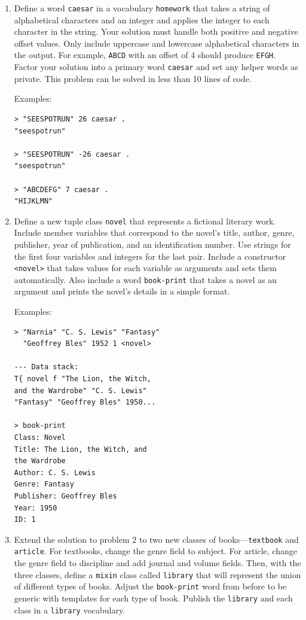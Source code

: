 \documentclass[sigconf]{acmart}
\begin{document}
\begin{enumerate}

\item
Define a word \texttt{caesar} in a vocabulary \texttt{homework}
that takes a string of alphabetical characters and an integer 
and applies the integer to each character in the string. Your
solution must handle both positive and negative offset values.
Only include uppercase and lowercase alphabetical characters 
in the output. For example, \texttt{ABCD} with an offset of 4 
should produce \texttt{EFGH}. Factor your solution into a
primary word \texttt{caesar} and set any helper words as 
private. This problem can be solved in less than 10 lines of 
code. 

\noindent
Examples:

\begin{lstlisting}
> "SEESPOTRUN" 26 caesar .
"seespotrun"

> "SEESPOTRUN" -26 caesar .
"seespotrun"

> "ABCDEFG" 7 caesar .
"HIJKLMN"
\end{lstlisting}

\item
Define a new tuple class \texttt{novel} that represents a 
fictional literary work. Include member variables that 
correspond to the novel's title, author, genre, publisher,
year of publication, and an identification number. Use 
strings for the first four variables and integers for the 
last pair. Include a constructor \texttt{<novel>} that takes
values for each variable as arguments and sets them 
automatically. Also include a word \texttt{book-print}
that takes a novel as an argument and prints the novel's
details in a simple format. 

\noindent
Examples:

\begin{lstlisting}
> "Narnia" "C. S. Lewis" "Fantasy" 
  "Geoffrey Bles" 1952 1 <novel>

--- Data stack:
T{ novel f "The Lion, the Witch, 
and the Wardrobe" "C. S. Lewis" 
"Fantasy" "Geoffrey Bles" 1950...

> book-print
Class: Novel
Title: The Lion, the Witch, and 
the Wardrobe
Author: C. S. Lewis
Genre: Fantasy
Publisher: Geoffrey Bles
Year: 1950
ID: 1
\end{lstlisting}

\item
Extend the solution to problem 2 to two new classes of
books---\texttt{textbook} and \texttt{article}. For textbooks, change
the genre field to subject. For article, change the genre
field to discipline and add journal and volume fields.
Then, with the three classes, define a \texttt{mixin} class 
called \texttt{library} that will represent the union of 
different types of books. Adjust the \texttt{book-print}
word from before to be generic with templates for each type 
of book. Publish the \texttt{library} and each class in a 
\texttt{library} vocabulary.


\end{enumerate}
\end{document}
